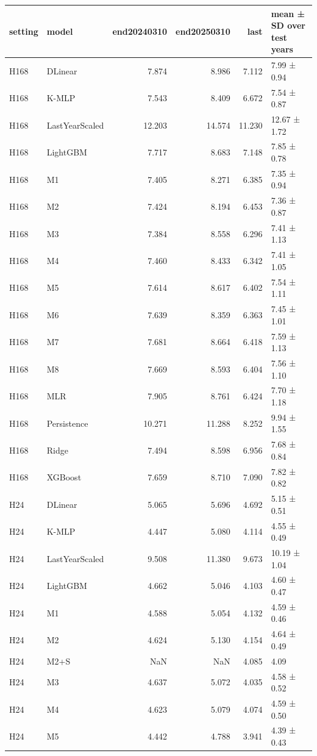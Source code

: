 \begin{tabular}{llrrrl}
\toprule
setting & model & end20240310 & end20250310 & last & mean ± SD over test years \\
\midrule
H168 & DLinear & 7.874 & 8.986 & 7.112 & 7.99 ± 0.94 \\
H168 & K-MLP & 7.543 & 8.409 & 6.672 & 7.54 ± 0.87 \\
H168 & LastYearScaled & 12.203 & 14.574 & 11.230 & 12.67 ± 1.72 \\
H168 & LightGBM & 7.717 & 8.683 & 7.148 & 7.85 ± 0.78 \\
H168 & M1 & 7.405 & 8.271 & 6.385 & 7.35 ± 0.94 \\
H168 & M2 & 7.424 & 8.194 & 6.453 & 7.36 ± 0.87 \\
H168 & M3 & 7.384 & 8.558 & 6.296 & 7.41 ± 1.13 \\
H168 & M4 & 7.460 & 8.433 & 6.342 & 7.41 ± 1.05 \\
H168 & M5 & 7.614 & 8.617 & 6.402 & 7.54 ± 1.11 \\
H168 & M6 & 7.639 & 8.359 & 6.363 & 7.45 ± 1.01 \\
H168 & M7 & 7.681 & 8.664 & 6.418 & 7.59 ± 1.13 \\
H168 & M8 & 7.669 & 8.593 & 6.404 & 7.56 ± 1.10 \\
H168 & MLR & 7.905 & 8.761 & 6.424 & 7.70 ± 1.18 \\
H168 & Persistence & 10.271 & 11.288 & 8.252 & 9.94 ± 1.55 \\
H168 & Ridge & 7.494 & 8.598 & 6.956 & 7.68 ± 0.84 \\
H168 & XGBoost & 7.659 & 8.710 & 7.090 & 7.82 ± 0.82 \\
H24 & DLinear & 5.065 & 5.696 & 4.692 & 5.15 ± 0.51 \\
H24 & K-MLP & 4.447 & 5.080 & 4.114 & 4.55 ± 0.49 \\
H24 & LastYearScaled & 9.508 & 11.380 & 9.673 & 10.19 ± 1.04 \\
H24 & LightGBM & 4.662 & 5.046 & 4.103 & 4.60 ± 0.47 \\
H24 & M1 & 4.588 & 5.054 & 4.132 & 4.59 ± 0.46 \\
H24 & M2 & 4.624 & 5.130 & 4.154 & 4.64 ± 0.49 \\
H24 & M2+S & NaN & NaN & 4.085 & 4.09 \\
H24 & M3 & 4.637 & 5.072 & 4.035 & 4.58 ± 0.52 \\
H24 & M4 & 4.623 & 5.079 & 4.074 & 4.59 ± 0.50 \\
H24 & M5 & 4.442 & 4.788 & 3.941 & 4.39 ± 0.43 \\

\end{tabular}
